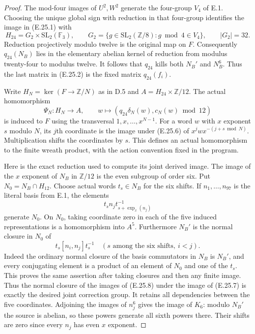 \begin{proof}
The mod-four images of $U^2,W^2$ generate the four-group $V_4$
of E.1.  Choosing the unique global sign with reduction in that
four-group identifies the image in (E.25.1) with
\[
 H_{24}=G_2\times\mathrm{SL}_2(\mathbb F_3),\qquad
 G_2=\{g\in\mathrm{SL}_2(\mathbb Z/8):g\bmod4\in V_4\},
 \qquad |G_2|=32.
 \tag{E.25.5}
\]
Reduction projectively modulo twelve is the original map on $F$.
Consequently $q_{24}(N_B)$ lies in the elementary abelian kernel
of reduction from modulus twenty-four to modulus twelve.
It follows that $q_{24}$ kills both $N_B'$ and $N_B^6$.
Thus the last matrix in (E.25.2) is the fixed matrix $q_{24}(f_i)$.

Write $H_N=\ker(F\to\mathbb Z/N)$ as in D.5 and
$A=H_{24}\times\mathbb Z/12$.  The actual homomorphism
\[
 \Psi_N:H_N\longrightarrow A,\qquad
 w\longmapsto(q_{24}\delta_N(w),c_N(w)\bmod12)
 \tag{E.25.6}
\]
is induced to $F$ using the transversal $1,x,\ldots,x^{N-1}$.
For a word $w$ with $x$ exponent $s$ modulo $N$, its $j$th
coordinate is the image under (E.25.6) of
$x^jwx^{-(j+s\bmod N)}$.  Multiplication shifts the coordinates
by $s$.  This defines an actual homomorphism to the finite wreath
product, with the action convention fixed in the program.

Here is the exact reduction used to compute its joint derived
image.  The image of the $x$ exponent of $N_B$ in $\mathbb Z/12$
is the even subgroup of order six.  Put $N_0=N_B\cap H_{12}$.
Choose actual words $t_s\in N_B$ for the six shifts.  If
$n_1,\ldots,n_{97}$ is the literal basis from E.1, the elements
\[
      t_s n_j t_{s+\operatorname{exp}_x(n_j)}^{-1}
 \tag{E.25.7}
\]
generate $N_0$.  On $N_0$, taking coordinate zero in each of
the five induced representations is a homomorphism into $A^5$.
Furthermore $N_B'$ is the normal closure in $N_0$ of
\[
             t_s[n_i,n_j]t_s^{-1}
       \quad(s\text{ among the six shifts},\ i<j).
 \tag{E.25.8}
\]
Indeed the ordinary normal closure of the basis commutators in
$N_B$ is $N_B'$, and every conjugating element is a product of
an element of $N_0$ and one of the $t_s$.  This proves the same
assertion after taking closures and then any finite image.
Thus the normal closure of the images of (E.25.8) under the
image of (E.25.7) is exactly the desired joint correction group.
It retains all dependencies between the five coordinates.
Adjoining the images of $n_j^6$ gives the image of $K_6$:
modulo $N_B'$ the source is abelian, so these powers generate
all sixth powers there.  Their shifts are zero since every
$n_j$ has even $x$ exponent.


\end{proof}
